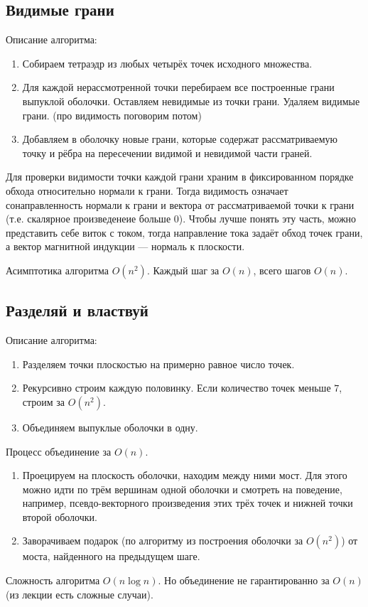 \subsection{Видимые грани}

Описание алгоритма:
\begin{enumerate}
  \item Собираем тетраэдр из любых четырёх точек исходного множества.
  \item Для каждой нерассмотренной точки перебираем все построенные грани выпуклой оболочки. 
    Оставляем невидимые из точки грани. Удаляем видимые грани. (про видимость поговорим потом)
  \item Добавляем в оболочку новые грани, которые содержат рассматриваемую точку и рёбра на пересечении
    видимой и невидимой части граней.
\end{enumerate}

Для проверки видимости точки каждой грани храним в фиксированном порядке обхода относительно нормали
к грани. Тогда видимость означает сонаправленность нормали к грани и вектора от рассматриваемой точки к
грани (т.е. скалярное произведенеие больше $0$). Чтобы лучше понять эту часть, можно представить себе виток
с током, тогда направление тока задаёт обход точек грани, а вектор магнитной индукции --- нормаль к плоскости.

\begin{remark}
  Асимптотика алгоритма $O(n^2)$. Каждый шаг за $O(n)$, всего шагов $O(n)$.
\end{remark}

\subsection{Разделяй и властвуй}

Описание алгоритма:
\begin{enumerate}
  \item Разделяем точки плоскостью на примерно равное число точек.
  \item Рекурсивно строим каждую половинку. Если количество точек меньше $7$, строим за $O(n^2)$.
  \item Объединяем выпуклые оболочки в одну.
\end{enumerate}

Процесс объединение за $O(n)$.
\begin{enumerate}
  \item Проецируем на плоскость оболочки, находим между ними мост. Для этого можно идти по трём
    вершинам одной оболочки и смотреть на поведение, например, псевдо-векторного произведения этих
    трёх точек и нижней точки второй оболочки.
  \item Заворачиваем подарок (по алгоритму из построения оболочки за $O(n^2)$) от моста, найденного на
    предыдущем шаге.
\end{enumerate}

\begin{remark}
  Сложность алгоритма $O(n \log n)$. Но объединение не гарантированно за $O(n)$ 
  (из лекции есть сложные случаи).
\end{remark}

